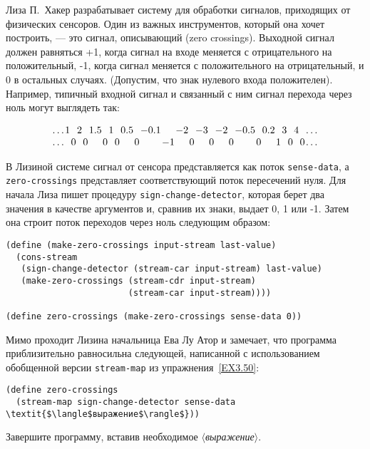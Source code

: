 \begin{exercise}{3.74}\label{EX3.74}%
Лиза П.~Хакер разрабатывает систему для обработки
сигналов, приходящих от физических сенсоров.  
Один из важных
инструментов, который она хочет построить, --- это сигнал, описывающий
 (zero crossings).
Выходной сигнал должен равняться +1, когда сигнал на входе меняется
с отрицательного на положительный, -1, когда сигнал меняется с
положительного на отрицательный, и 0 в
остальных случаях. (Допустим, что знак нулевого входа
положителен). Например, типичный входной сигнал и связанный с ним
сигнал перехода через ноль могут выглядеть так:

\medskip
$$
\arraycolsep=0,05em
\begin{array}{crlrlrlrlrlrlrlrlrlrlrlrlrlrr}
\ldots & 1&  & 2&  & 1.5&  & 1&  & 0.5&  & -0.1&   & -2&  & -3&  & -2&  & -0.5&  & 0.2&  & 3&  & 4 & & \ldots\\
\ldots &  &0 &  &0 &    &0 &  &0 &    &0 &     &-1 &   &0 &   &0 &   &0 &     &0 &    &1 &  &0 &  &0 &  \ldots\\
\end{array}
$$

\medskip
В Лизиной системе сигнал от сенсора представляется как поток
{\tt sense-data}, а {\tt zero-crossings} представляет
соответствующий поток пересечений нуля.  Для начала Лиза пишет
процедуру {\tt sign-change-detector}, которая берет два
значения в качестве аргументов и, срав\-нив их знаки, выдает 0, 1 или -1.
Затем она строит поток переходов через ноль следующим образом:

\begin{Verbatim}[fontsize=\small]
(define (make-zero-crossings input-stream last-value)
  (cons-stream
   (sign-change-detector (stream-car input-stream) last-value)
   (make-zero-crossings (stream-cdr input-stream)
                        (stream-car input-stream))))

(define zero-crossings (make-zero-crossings sense-data 0))
\end{Verbatim}
Мимо проходит Лизина начальница Ева Лу Атор и замечает, что
программа приблизительно равносильна следующей, написанной с
использованием обобщенной версии {\tt stream-map} из
упражнения~\ref{EX3.50}:

\begin{Verbatim}[fontsize=\small]
(define zero-crossings
  (stream-map sign-change-detector sense-data \textit{$\langle$выражение$\rangle$}))
\end{Verbatim}
Завершите программу, вставив необходимое \textit{$\langle$выражение$\rangle$}.
\end{exercise}
